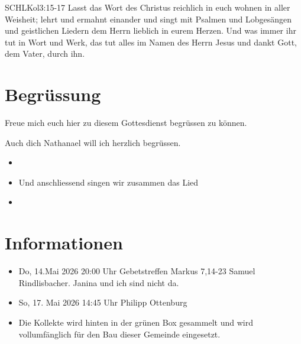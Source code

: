 \documentclass[fontsize=14pt]{../../inc/mybib}
\newcommand{\Name}{Nathanael}
\begin{document}
\begin{bibelbox}{SCHL}{Kol}{3:15-17}
    Lasst das Wort des Christus reichlich in euch wohnen in aller Weisheit; lehrt und ermahnt einander und singt mit Psalmen und Lobgesängen und geistlichen Liedern dem Herrn lieblich in eurem Herzen. Und was immer ihr tut in Wort und Werk, das tut alles im Namen des Herrn Jesus und dankt Gott, dem Vater, durch ihn.
\end{bibelbox}
\section{Begrüssung}
Freue mich euch hier zu diesem Gottesdienst begrüssen zu können.

Auch dich \Name{} will ich herzlich begrüssen.
\begin{itemize}
    \item[] 
    \item[] Und anschliessend singen wir zusammen das Lied
    \item[] \lied[b]{}
\end{itemize}

\section{Informationen}
\begin{itemize}
    \item {} Do, 14.Mai 2026 20:00 Uhr Gebetstreffen Markus 7,14-23 Samuel Rindlisbacher. Janina und ich sind nicht da.
    \item {} So, 17. Mai 2026 14:45 Uhr Philipp Ottenburg

    \item {} Die Kollekte wird hinten in der grünen Box gesammelt und wird vollumfänglich für den Bau dieser Gemeinde eingesetzt.
\end{itemize}
\end{document}
